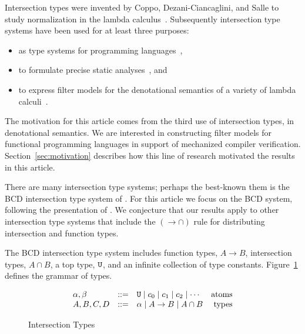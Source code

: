 \documentclass{article}
\begin{document}
Intersection types were invented by Coppo, Dezani-Ciancaglini, and
Salle to study normalization in the lambda
calculus~\citep{Coppo:1979aa}. Subsequently intersection type systems
have been used for at least three purposes:
\begin{itemize}
  \item as type systems for programming
    languages~\citep{Reynolds:1988aa,Pierce:1991aa,Castagna:2014aa,Chaudhuri:2014aa,Oliveira:2016aa,Muehlboeck:2018aa,Bi:2019aa,Dunfield:2019aa,Microsoft:TypeScript2020aa,Dotty:2020aa},
  \item to formulate precise static
    analyses~\citep{Turbak:1997aa,Palsberg:1998aa,Mossin:2003aa,Simoes:2007aa},
    and
  \item to express filter models for the denotational semantics of a
    variety of lambda
    calculi~\citep{Coppo:1980ab,Coppo:1981aa,Coppo:1984aa,Honsell:1992aa,Abramsky:1993fk,Honsell:1999aa,Ishihara:2002aa,Rocca:2004aa,Dezani-Ciancaglini:2005aa,Alessi:2006aa,Barendregt:2013aa}.
\end{itemize}
The motivation for this article comes from the third use of
intersection types, in denotational semantics.  We are interested in
constructing filter models for functional programming languages in
support of mechanized compiler
verification. Section~\ref{sec:motivation} describes how this line of
research motivated the results in this article.

There are many intersection type systems; perhaps the best-known them
is the BCD intersection type system of \citet{Barendregt:1983aa}. For
this article we focus on the BCD system, following the presentation of
\citet{Barendregt:2013aa}. We conjecture that our results apply to
other intersection type systems that include the $({\to}{\cap})$ rule
for distributing intersection and function types.

The BCD intersection type system includes function types, $A \to B$,
intersection types, $A \cap B$, a top type, $\mathtt{U}$, and an infinite
collection of type constants. Figure~\ref{fig:types} defines the
grammar of types.

\begin{figure}[tbp]
  \[
  \begin{array}{lclr}
    \alpha,\beta & ::= & \mathtt{U} \mid c_0 \mid c_1 \mid c_2 \mid \cdots & \text{atoms}\\
    A,B,C,D & ::= & \alpha \mid A \to B \mid A \cap B & \text{types}
  \end{array}
  \]
  \caption{Intersection Types}
  \label{fig:types}
\end{figure}
\end{document}
